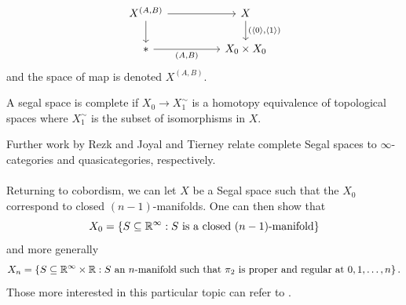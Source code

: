 $$%
\begin{tikzcd}
	{X^{(A,B)}} && X \\
	{*} && {X_{0}\times X_{0}}
	\arrow["{(A,B)}"', from=2-1, to=2-3]
	\arrow["{(\langle0\rangle,\langle1\rangle)}", from=1-3, to=2-3]
	\arrow[from=1-1, to=1-3]
	\arrow[from=1-1, to=2-1]
\end{tikzcd}$$
and the space of map is denoted $X^{(A,B)}$. 
\begin{definition}
    A segal space is complete if $X_{0}\to X_{1}^{\sim}$ is a homotopy equivalence of topological spaces where $X_{1}^{\sim}$ is the subset of isomorphisms in $X$. 
\end{definition}
Further work by Rezk and Joyal and Tierney relate complete Segal spaces to $\infty$-categories and quasicategories, respectively. 
\\\\
Returning to cobordism, we can let $X$ be a Segal space such that the $X_{0}$ correspond to closed $(n-1)$-manifolds. One can then show that 
$$X_{0}=\left\{S\subseteq\mathbb{R}^{\infty}:S \text{ is a closed }(n-1)\text{-manifold}\right\}$$
and more generally
$$X_{n}=\left\{S\subseteq\mathbb{R}^{\infty}\times\mathbb{R}: S\text{ an }n\text{-manifold such that }\pi_{2}\text{ is proper and regular at }0,1,\dots,n\right\}.$$
Those more interested in this particular topic can refer to \cite{CalaqueScheimbauer}.